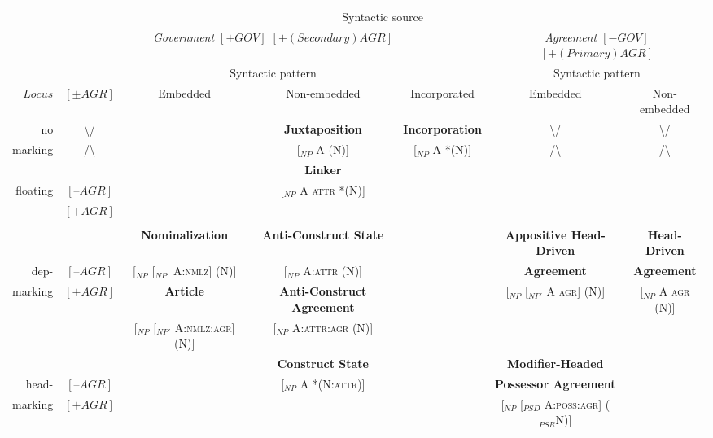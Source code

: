 \newpage
\begin{landscape}
\begin{table}
\begin{footnotesize}
\begin{tabular}{|| r || c | c | c | c || c | c ||}
\lsptoprule
			&\multicolumn{6}{c||}{Syntactic source}\\

			\cline{2-7}
			&\multicolumn{4}{c||}{\textit{Government $[+GOV]$ $[±(Secondary)AGR]$}}&\multicolumn{2}{c||}{\textit{Agreement $[-GOV]$ $[+(Primary)AGR]$}}\\
			\cline{2-7}
			&\multicolumn{4}{c||}{Syntactic pattern}&\multicolumn{2}{c||}{Syntactic pattern}\\
			\cline{2-7}
$Locus$		&$[±AGR]$	&Embedded	&Non-embedded			&Incorporated	&Embedded&Non-embedded\\
\lsptoprule
no			&\textbackslash/&			&{\bf Juxtaposition}						&{\bf Incorporation}			&\textbackslash/&\textbackslash/ \\
marking		&/\textbackslash&			&[$_{NP}$ A (N)]				&[$_{NP}$ A *(N)]&/\textbackslash&/\textbackslash\\
\lsptoprule
			& 			&			&{\bf Linker}						&			&			&\\
floating		&$[–AGR]$	&			&[$_{NP}$ A \textsc{attr} *(N)]	&			&			&\\
 			\cline{2-5}
			&$[+AGR]$	&			&							&			&			&\\
			&			&			&							&			&			&\\
\lsptoprule
			&			&{\bf Nominalization}&{\bf Anti-Construct State}			&	&{\bf Appositive Head-Driven}&{\bf Head-Driven}\\
dep-			&$[–AGR]$	&[$_{NP}$ [$_{NP'}$ A:\textsc{nmlz}] (N)]&[$_{NP}$ A:\textsc{attr} (N)]&&{\bf Agreement}&{\bf Agreement}\\		
			\cline{2-5}
marking		&$[+AGR]$	&{\bf Article}		&{\bf Anti-Construct Agreement}	&			&[$_{NP}$ [$_{NP'}$ A \textsc{agr}] (N)]&[$_{NP}$ A \textsc{agr} (N)]\\
			&&[$_{NP}$ [$_{NP'}$ A:\textsc{nmlz:agr}] (N)]&[$_{NP}$ A:\textsc{attr:agr} (N)]&&&\\
\lsptoprule
			&			&			&{\bf Construct State}						&			&{\bf Modifier-Headed }	&\\
head-		&$[–AGR]$	&			&[$_{NP}$ A *(N:\textsc{attr})]&&{\bf Possessor Agreement}&\\
			\cline{2-5}
marking		&$[+AGR]$	&			&							&&[$_{NP}$ [$_{PSD}$ A:\textsc{poss:agr}] ($_{PSR}$N)]&\\

\end{tabular}
\end{footnotesize}
\end{table}
\end{landscape}

